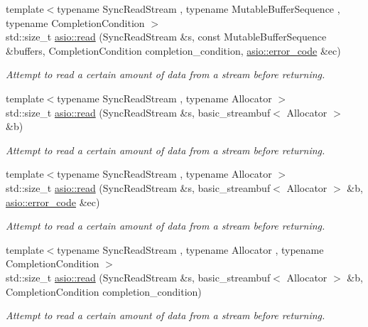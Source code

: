 \begin{DoxyCompactItemize}
{\footnotesize template$<$typename Sync\+Read\+Stream , typename Mutable\+Buffer\+Sequence , typename Completion\+Condition $>$ }\\std\+::size\+\_\+t \hyperlink{group__read_ga68b2bc31177c2bf7cba974b5c65f9036}{asio\+::read} (Sync\+Read\+Stream \&s, const Mutable\+Buffer\+Sequence \&buffers, Completion\+Condition completion\+\_\+condition, \hyperlink{classasio_1_1error__code}{asio\+::error\+\_\+code} \&ec)
\begin{DoxyCompactList}\small\item\em Attempt to read a certain amount of data from a stream before returning. \end{DoxyCompactList}\item 
{\footnotesize template$<$typename Sync\+Read\+Stream , typename Allocator $>$ }\\std\+::size\+\_\+t \hyperlink{group__read_gaaeda9d140628ff399cbe4a076cb15cee}{asio\+::read} (Sync\+Read\+Stream \&s, basic\+\_\+streambuf$<$ Allocator $>$ \&b)
\begin{DoxyCompactList}\small\item\em Attempt to read a certain amount of data from a stream before returning. \end{DoxyCompactList}\item 
{\footnotesize template$<$typename Sync\+Read\+Stream , typename Allocator $>$ }\\std\+::size\+\_\+t \hyperlink{group__read_gabc0bc3183df1291c7b2a35ec30d5428c}{asio\+::read} (Sync\+Read\+Stream \&s, basic\+\_\+streambuf$<$ Allocator $>$ \&b, \hyperlink{classasio_1_1error__code}{asio\+::error\+\_\+code} \&ec)
\begin{DoxyCompactList}\small\item\em Attempt to read a certain amount of data from a stream before returning. \end{DoxyCompactList}\item 
{\footnotesize template$<$typename Sync\+Read\+Stream , typename Allocator , typename Completion\+Condition $>$ }\\std\+::size\+\_\+t \hyperlink{group__read_gaeadfb55ae835155abb8b6dc11a063b54}{asio\+::read} (Sync\+Read\+Stream \&s, basic\+\_\+streambuf$<$ Allocator $>$ \&b, Completion\+Condition completion\+\_\+condition)
\begin{DoxyCompactList}\small\item\em Attempt to read a certain amount of data from a stream before returning. \end{DoxyCompactList}\item 

\end{DoxyCompactItemize}
